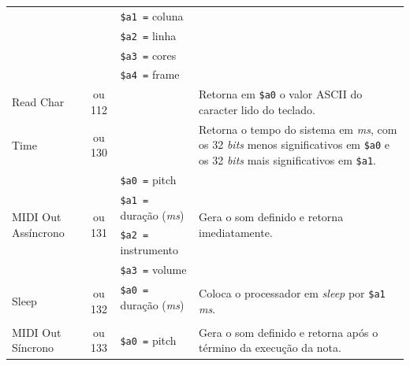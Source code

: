 \begin{longtable}{|l|c|p{3.5cm}|l |}
            & & \texttt{\$a1 =} coluna      & \\*
            & & \texttt{\$a2 =} linha       & \\*
            & & \texttt{\$a3 =} cores       & \\*
            & & \texttt{\$a4 =} frame       & \\
        \hline
        \multirow{3}{*}{Read Char}          & \multirow{3}{*}{\parbox{0.6cm}{ ou 112}}
            &                               & \multirow{3}{*}{\parbox{7cm}{Retorna em \texttt{\$a0} o valor ASCII do caracter lido do teclado.}}\\*
            & & & \\*
            & & & \\
        \hline
        \multirow{3}{*}{Time}               & \multirow{3}{*}{\parbox{0.6cm}{ ou 130}}
            &                               & \multirow{3}{*}{\parbox{7cm}{Retorna o tempo do sistema em \textit{ms}, com os 32 \textit{bits} menos significativos em \texttt{\$a0}
                                                e os 32 \textit{bits} mais significativos em \texttt{\$a1}.}}\\*
            & & & \\*
            & & & \\
        \hline
        \multirow{4}{*}{MIDI Out Assíncrono }   & \multirow{4}{*}{\parbox{0.6cm}{ ou 131}}
              & \texttt{\$a0 =} pitch       & \multirow{4}{*}{\parbox{7cm}{Gera o som definido e retorna imediatamente.}}\\*
            & & \texttt{\$a1 =} duração (\textit{ms}) & \\*
            & & \texttt{\$a2 =} instrumento & \\*
            & & \texttt{\$a3 =} volume      & \\
        \hline
        \multirow{3}{*}{Sleep}              & \multirow{3}{*}{\parbox{0.6cm}{ ou 132}}
            & \texttt{\$a0 =} duração (\textit{ms}) & \multirow{3}{*}{\parbox{7cm}{Coloca o processador em \textit{sleep} por \texttt{\$a1} \textit{ms}.}}\\*
            & & & \\*
            & & & \\
        \hline
        \multirow{4}{*}{MIDI Out Síncrono }     & \multirow{4}{*}{\parbox{0.6cm}{ ou 133}}
              & \texttt{\$a0 =} pitch       & \multirow{4}{*}{\parbox{7cm}{Gera o som definido e retorna após o término da execução da nota.}}\\*

\end{longtable}
